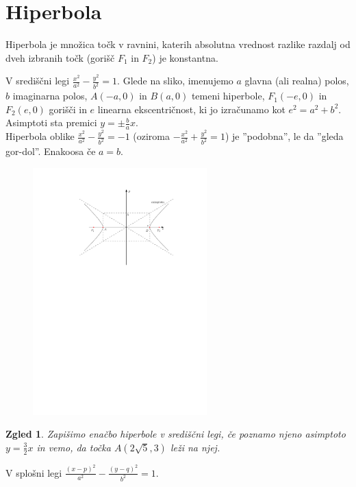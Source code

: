 \documentclass{article}
\newtheorem*{zgled}{Zgled}
\begin{document}
\section{Hiperbola}

Hiperbola je množica točk v ravnini, katerih absolutna vrednost razlike razdalj od dveh izbranih točk (gorišč $F_1$ in $F_2$) je konstantna.

V središčni legi $\frac{x^2}{a^2}-\frac{y^2}{b^2}=1$. Glede na sliko, imenujemo $a$ glavna (ali realna) polos, $b$ imaginarna polos, $A(-a,0)$ in $B(a,0)$ temeni hiperbole, $F_1(-e,0)$ in $F_2(e,0)$ gorišči in $e$ linearna ekscentričnost, ki jo izračunamo kot $e^2=a^2+b^2$. Asimptoti sta premici $y=\pm\frac{b}{a}x$.\\
Hiperbola oblike $\frac{x^2}{a^2}-\frac{y^2}{b^2}=-1$ (oziroma $-\frac{x^2}{a^2}+\frac{y^2}{b^2}=1$) je ''podobna'', le da ''gleda gor-dol''. Enakoosa če $a=b$.

\begin{figure}[H]
\includegraphics[width=0.6\textwidth]{stoznice.hiperbola.pdf}
\centering
\end{figure}

\begin{zgled}
    Zapišimo enačbo hiperbole v središčni legi, če poznamo njeno asimptoto $y=\frac{3}{2}x$ in vemo, da točka $A(2\sqrt{5},3)$ leži na njej.
\end{zgled}

V splošni legi $\frac{(x-p)^2}{a^2}-\frac{(y-q)^2}{b^2}=1$.
\end{document}
